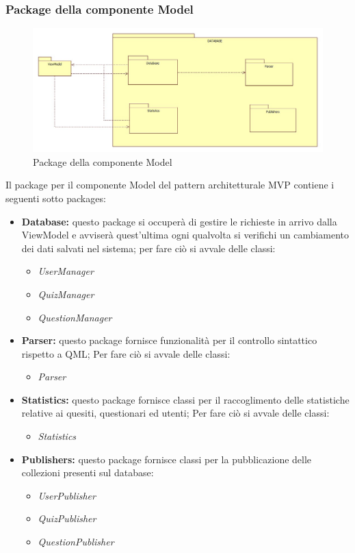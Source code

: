 \subsubsection{Package della componente Model}
	\begin{figure}[h!]
	\begin{center}
		\includegraphics[scale=0.45]{../images/ModelPackage.jpg}
		\caption{Package della componente Model}
	\end{center}
	\end{figure}
	Il package per il componente Model del pattern architetturale MVP contiene i seguenti sotto packages:
	\begin{itemize}
		\item\textbf{Database:} questo package si occuperà di gestire le richieste in arrivo dalla ViewModel e avviserà quest'ultima ogni qualvolta si verifichi un cambiamento dei dati salvati nel sistema; per fare ciò si avvale delle classi:
			\begin{itemize}
				\item\textit{UserManager}
				\item\textit{QuizManager}
				\item\textit{QuestionManager}
			\end{itemize}
		\item\textbf{Parser:} questo package fornisce funzionalità per il controllo sintattico rispetto a QML; Per fare ciò si avvale delle classi:
			\begin{itemize}
				\item\textit{Parser}
			\end{itemize}
		\item\textbf{Statistics:} questo package fornisce classi per il raccoglimento delle statistiche relative ai quesiti, questionari ed utenti; Per fare ciò si avvale delle classi:
			\begin{itemize}
				\item\textit{Statistics}
			\end{itemize}
			\item\textbf{Publishers:} questo package fornisce classi per la pubblicazione delle collezioni presenti sul database:
			\begin{itemize}
				\item\textit{UserPublisher}
				\item\textit{QuizPublisher}
				\item\textit{QuestionPublisher}
			\end{itemize}
		\end{itemize}
		\newpage